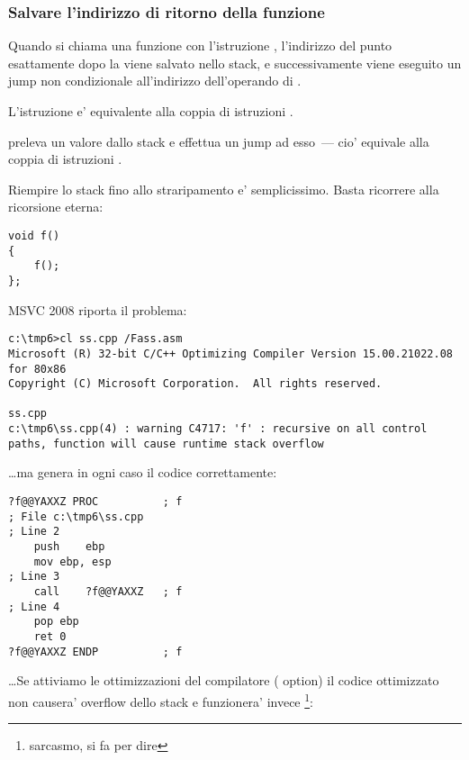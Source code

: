 \subsubsection{Salvare l'indirizzo di ritorno della funzione}


Quando si chiama una funzione con l'istruzione \CALL, l'indirizzo del punto esattamente dopo la \CALL viene salvato nello stack, e successivamente
viene eseguito un jump non condizionale all'indirizzo dell'operando di \CALL.

L'istruzione \CALL e' equivalente alla coppia di istruzioni .

\RET preleva un valore dallo stack e effettua un jump ad esso~--- cio' equivale alla coppia di istruzioni .

\myindex{\Stack!\MLStackOverflow}
\myindex{\Recursion}

Riempire lo stack fino allo straripamento e' semplicissimo. Basta ricorrere alla ricorsione eterna:

\begin{lstlisting}[style=customc]
void f()
{
	f();
};
\end{lstlisting}

MSVC 2008 riporta il problema:

\begin{lstlisting}
c:\tmp6>cl ss.cpp /Fass.asm
Microsoft (R) 32-bit C/C++ Optimizing Compiler Version 15.00.21022.08 for 80x86
Copyright (C) Microsoft Corporation.  All rights reserved.

ss.cpp
c:\tmp6\ss.cpp(4) : warning C4717: 'f' : recursive on all control paths, function will cause runtime stack overflow
\end{lstlisting}

\dots ma genera in ogni caso il codice correttamente:

\begin{lstlisting}[style=customasmx86]
?f@@YAXXZ PROC			; f
; File c:\tmp6\ss.cpp
; Line 2
	push	ebp
	mov	ebp, esp
; Line 3
	call	?f@@YAXXZ	; f
; Line 4
	pop	ebp
	ret	0
?f@@YAXXZ ENDP			; f
\end{lstlisting}

\dots Se attiviamo le ottimizzazioni del compilatore (\TT{\Ox} option) il codice ottimizzato non causera' overflow dello stack 
e funzionera' invece \footnote{sarcasmo, si fa per dire}:

